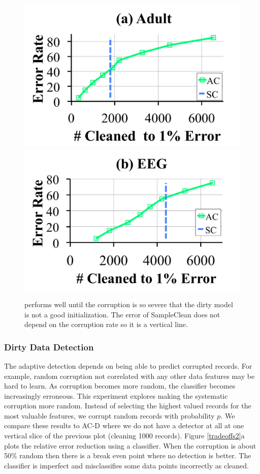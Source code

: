 \begin{figure}[t]
\centering
 \includegraphics[width=0.49\columnwidth]{exp/exp9a.pdf}
  \includegraphics[width=0.49\columnwidth]{exp/exp9b.pdf}\vspace{-1em}
 \caption{\sys performs well until the corruption is so severe that the dirty model is not a good initialization. The error of SampleClean does not depend on the corruption rate so it is a vertical line.  \label{bias}}\vspace{-1.5em}
\end{figure}

\subsubsection{Dirty Data Detection}
The adaptive detection depends on being able to predict corrupted records.
For example, random corruption not correlated with any other data features may be hard to learn.
As corruption becomes more random, the classifier becomes increasingly erroneous.
This experiment explores making the systematic corruption more random.
Instead of selecting the highest valued records for the most valuable features, we corrupt random records with probability $p$. 
We compare these results to AC-D where we do not have a detector at all at one vertical slice of the previous plot (cleaning 1000 records).
Figure \ref{tradeoffs2}a plots the relative error reduction using a classifier.
When the corruption is about 50\% random then there is a break even point where no detection is better.
The classifier is imperfect and misclassifies some data points incorrectly as cleaned.

